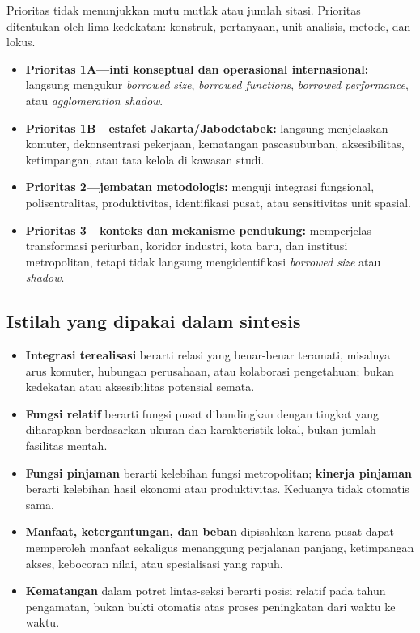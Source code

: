 \documentclass[
  indonesian,
  11pt,
  a4paper,
  oneside,
  openany]{report}
\providecommand{\tightlist}{%
  \setlength{\itemsep}{0pt}\setlength{\parskip}{0pt}}
\begin{document}
Prioritas tidak menunjukkan mutu mutlak atau jumlah sitasi. Prioritas
ditentukan oleh lima kedekatan: konstruk, pertanyaan, unit analisis,
metode, dan lokus.

\begin{itemize}
\tightlist
\item
  \textbf{Prioritas 1A---inti konseptual dan operasional internasional:}
  langsung mengukur \emph{borrowed size}, \emph{borrowed functions},
  \emph{borrowed performance}, atau \emph{agglomeration shadow}.
\item
  \textbf{Prioritas 1B---estafet Jakarta/Jabodetabek:} langsung
  menjelaskan komuter, dekonsentrasi pekerjaan, kematangan
  pascasuburban, aksesibilitas, ketimpangan, atau tata kelola di kawasan
  studi.
\item
  \textbf{Prioritas 2---jembatan metodologis:} menguji integrasi
  fungsional, polisentralitas, produktivitas, identifikasi pusat, atau
  sensitivitas unit spasial.
\item
  \textbf{Prioritas 3---konteks dan mekanisme pendukung:} memperjelas
  transformasi periurban, koridor industri, kota baru, dan institusi
  metropolitan, tetapi tidak langsung mengidentifikasi \emph{borrowed
  size} atau \emph{shadow}.
\end{itemize}

\subsection{Istilah yang dipakai dalam
sintesis}\label{istilah-yang-dipakai-dalam-sintesis}

\begin{itemize}
\tightlist
\item
  \textbf{Integrasi terealisasi} berarti relasi yang benar-benar
  teramati, misalnya arus komuter, hubungan perusahaan, atau kolaborasi
  pengetahuan; bukan kedekatan atau aksesibilitas potensial semata.
\item
  \textbf{Fungsi relatif} berarti fungsi pusat dibandingkan dengan
  tingkat yang diharapkan berdasarkan ukuran dan karakteristik lokal,
  bukan jumlah fasilitas mentah.
\item
  \textbf{Fungsi pinjaman} berarti kelebihan fungsi metropolitan;
  \textbf{kinerja pinjaman} berarti kelebihan hasil ekonomi atau
  produktivitas. Keduanya tidak otomatis sama.
\item
  \textbf{Manfaat, ketergantungan, dan beban} dipisahkan karena pusat
  dapat memperoleh manfaat sekaligus menanggung perjalanan panjang,
  ketimpangan akses, kebocoran nilai, atau spesialisasi yang rapuh.
\item
  \textbf{Kematangan} dalam potret lintas-seksi berarti posisi relatif
  pada tahun pengamatan, bukan bukti otomatis atas proses peningkatan
  dari waktu ke waktu.
\end{itemize}
\end{document}
